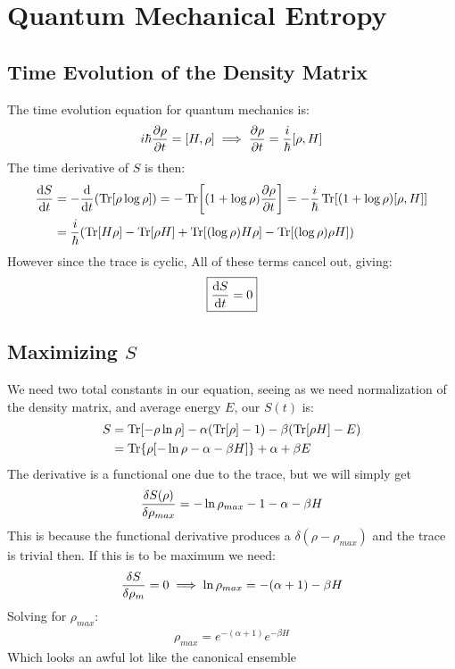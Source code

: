 \documentclass[12pt]{article}
\begin{document}
\section{Quantum Mechanical Entropy}
\subsection{Time Evolution of the Density Matrix}
The time evolution equation for quantum mechanics is:
\begin{align*}
  i\hbar\pdv{\rho}{t}=\comm{H}{\rho}\implies
  \pdv{\rho}{t}=\frac{i}{\hbar}\comm{\rho}{H}
\end{align*}
The time derivative of $S$ is then:
\begin{align*}
  \dv{S}{t}&=-\dv{t}\qty(\Tr[\rho\log\rho])=
  -\Tr[(1+\log\rho)\pdv{\rho}{t}]=-\frac{i}{\hbar}
  \Tr[(1+\log\rho)\comm{\rho}{H}]\\
  &=\frac{i}{\hbar}\qty(\Tr[H\rho]-\Tr[\rho H]+\Tr[(\log\rho)H\rho]
  -\Tr[(\log\rho)\rho H])
\end{align*}
However since the trace is cyclic, All of these terms cancel out, giving:
\begin{align}
  \boxed{\dv{S}{t}=0}
\end{align}

\subsection{Maximizing $S$}
We need two total constants in our equation, seeing as we need normalization of the density matrix, and average energy $E$, our $S(t)$ is:
\begin{align*}
  S&=\Tr[-\rho\ln\rho]-\alpha\qty(\Tr[\rho]-1)-\beta\qty(\Tr[\rho H]-E)\\
  &=\Tr{\rho\qty[-\ln\rho-\alpha-\beta H]}+\alpha+\beta E
\end{align*}
The derivative is a functional one due to the trace, but we will simply get
\begin{align*}
  \fdv{S(\rho)}{\rho_{max}}=-\ln\rho_{max}-1-\alpha-\beta H
\end{align*}
This is because the functional derivative produces a $\delta(\rho-\rho_{max})$ and the trace is trivial then. If this is to be maximum we need:
\begin{align*}
  \fdv{S}{\rho_m}=0\implies\ln\rho_{max}=-\qty(\alpha+1)-\beta H
\end{align*}
Solving for $\rho_{max}$:
\begin{align}
  \boxed{\rho_{max}=e^{-(\alpha+1)}e^{-\beta H}}
\end{align}
Which looks an awful lot like the canonical ensemble
\end{document}
